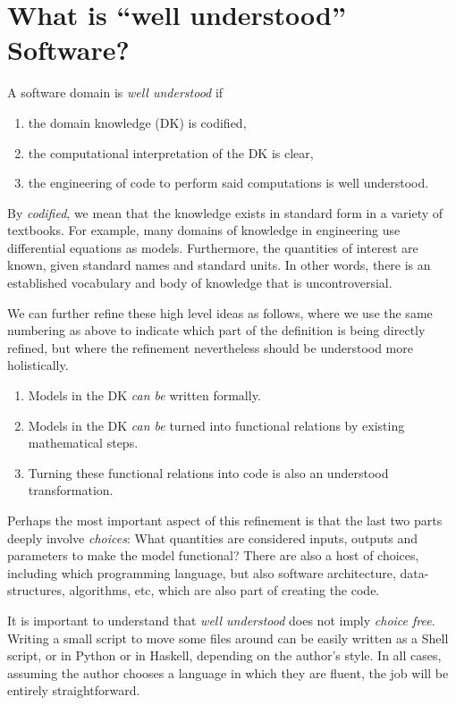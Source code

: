 \documentclass[10pt,twoside,onecolumn,openany,letterpaper]{memoir}
\begin{document}
\chapter{What is ``well understood'' Software?}\label{ch:wellUnderstood}

\begin{defn}
A software domain is \emph{well understood} if
\begin{enumerate}
\item the domain knowledge (DK) is codified,
\item the computational interpretation of the DK is clear,
\item the engineering of code to perform said computations is well
understood.
\end{enumerate}
\end{defn}

By \emph{codified}, we mean that the knowledge exists in standard form in
a variety of textbooks. For example, many domains of knowledge in engineering
use differential equations as models. Furthermore, the quantities of interest
are known, given standard names and standard units. In other words, there is
an established vocabulary and body of knowledge that is uncontroversial.

We can further refine these high level ideas as follows, where we use
the same numbering as above to indicate which part of the definition is
being directly refined, but where the refinement nevertheless should be
understood more holistically.
\begin{enumerate}
\item Models in the DK \emph{can be} written formally.
\item Models in the DK \emph{can be} turned into functional relations by
 existing mathematical steps.
\item Turning these functional relations into code is also an understood
 transformation.
\end{enumerate}
Perhaps the most important aspect of this refinement is that the last two
parts deeply involve \emph{choices}: What quantities are considered inputs,
outputs and parameters to make the model functional? There are also a host
of choices, including which programming language, but also software
architecture, data-structures, algorithms, etc, which are also part of
creating the code.

It is important to understand that \emph{well understood} does not imply
\emph{choice free}.  Writing a small script to move some files around can
be easily written as a Shell script, or in Python or in Haskell, depending on
the author's style. In all cases, assuming the author chooses a language
in which they are fluent, the job will be entirely straightforward.
\end{document}
